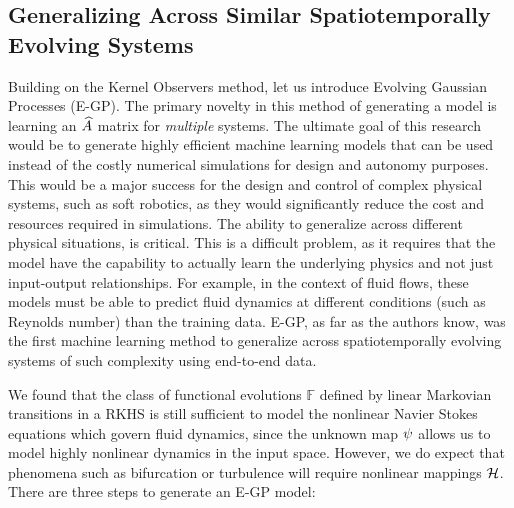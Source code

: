 \subsection{Generalizing Across Similar Spatiotemporally Evolving Systems} \label{sec:egp}
Building on the Kernel Observers method, let us introduce Evolving Gaussian Processes (E-GP). The primary novelty in this method of generating a model is learning an $\widehat{A}$ matrix for \emph{multiple} systems. The ultimate goal of this research would be to generate highly efficient machine learning models that can be used instead of the costly numerical simulations for design and autonomy purposes. This would be a major success for the design and control of complex physical systems, such as soft robotics, as they would significantly reduce the cost and resources required in simulations. The ability to generalize across different physical situations, is critical. This is a difficult problem, as it requires that the model have the capability to actually learn the underlying physics and not just input-output relationships. For example, in the context of fluid flows, these models must be able to predict fluid dynamics at different conditions (such as Reynolds number) than the training data. E-GP, as far as the authors know, was the first machine learning method to generalize across spatiotemporally evolving systems of such complexity using end-to-end data.

We found that the class of functional evolutions $\mathbb{F}$ defined by linear Markovian transitions in a RKHS is still sufficient to model the nonlinear Navier Stokes equations which govern fluid dynamics, since the unknown map $\psi$ allows us to model highly nonlinear dynamics in the input space. However, we do expect that phenomena such as bifurcation or turbulence will require nonlinear mappings $\mathcal{H}$. There are three steps to generate an E-GP model:


